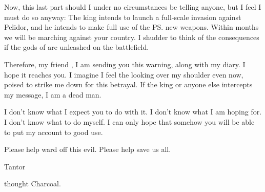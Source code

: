 \begin{diary}
Now, this last part should I under no circumstances be telling anyone, but I feel I must do so anyway: 
The king intends to launch a full-scale invasion against Pelidor, and he intends to make full use of the \ps{\ishrah} new weapons. 
Within months we will be marching against your country. 
I shudder to think of the consequences if the gods of \EreshKal{} are unleashed on the battlefield. 

Therefore, my friend \Ambrose, I am sending you this warning, along with my diary. 
I hope it reaches you. 
I imagine I feel the \daemons{} looking over my shoulder even now, poised to strike me down for this betrayal. 
If the king or anyone else intercepts my message, I am a dead man. 

I don't know what I expect you to do with it. 
I don't know what I am hoping for. 
I don't know what to do myself. 
I can only hope that somehow you will be able to put my account to good use. 

Please help ward off this evil. 
Please help save us all. 

\begin{flushright}
\Jirad{} Tantor
\end{flushright}
\end{diary}









\noindent
{} thought Charcoal. 










